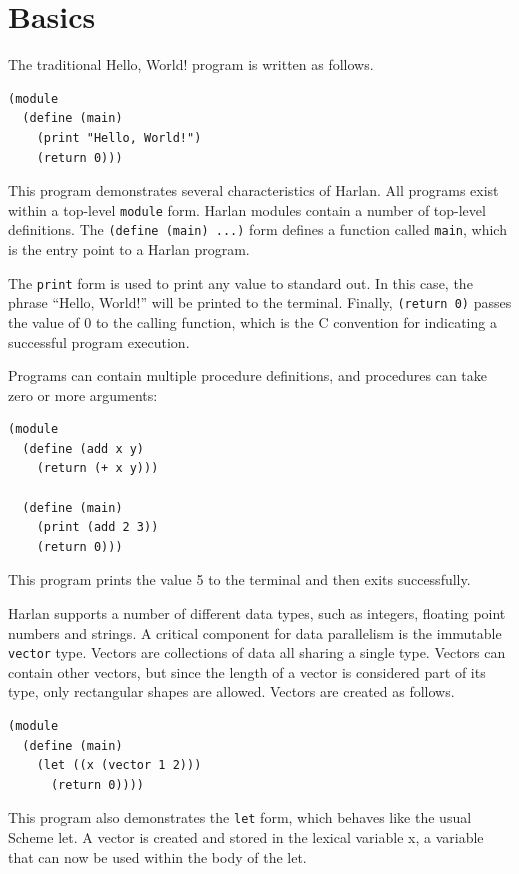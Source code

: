 \documentclass[oneside]{report}
\begin{document}
\section{Basics}

The traditional Hello, World! program is written as follows.

\begin{lstlisting}
(module
  (define (main)
    (print "Hello, World!")
    (return 0)))
\end{lstlisting}

This program demonstrates several characteristics of Harlan. All
programs exist within a top-level \lstinline{module} form. Harlan
modules contain a number of top-level definitions. The
\lstinline{(define (main) ...)} form defines a function called
\lstinline{main}, which is the entry point to a Harlan program.

The \lstinline{print} form is used to print any value to standard
out. In this case, the phrase ``Hello, World!'' will be printed to the
terminal. Finally, \lstinline{(return 0)} passes the value of 0 to the
calling function, which is the C convention for indicating a
successful program execution.

Programs can contain multiple procedure definitions, and procedures
can take zero or more arguments:

\begin{lstlisting}
(module
  (define (add x y)
    (return (+ x y)))

  (define (main)
    (print (add 2 3))
    (return 0)))
\end{lstlisting}

This program prints the value 5 to the terminal and then exits
successfully.

Harlan supports a number of different data types, such as integers,
floating point numbers and strings. A critical component for data
parallelism is the immutable \lstinline{vector} type. Vectors are
collections of data all sharing a single type. Vectors can contain
other vectors, but since the length of a vector is considered part of
its type, only rectangular shapes are allowed. Vectors are created as
follows.

\begin{lstlisting}
(module
  (define (main)
    (let ((x (vector 1 2)))
      (return 0))))
\end{lstlisting}

This program also demonstrates the \lstinline{let} form, which behaves
like the usual Scheme let. A vector is created and stored in the
lexical variable x, a variable that can now be used within the body of
the let.
\end{document}
